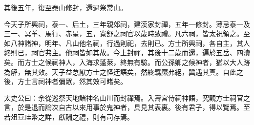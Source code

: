 \begin{pinyinscope}
其後五年，復至泰山修封，還過祭常山。

今天子所興祠，泰一、后土，三年親郊祠，建漢家封禪，五年一修封。薄忌泰一及三一、冥羊、馬行、赤星，五，寬舒之祠官以歲時致禮。凡六祠，皆太祝領之。至如八神諸神，明年、凡山他名祠，行過則祀，去則已。方士所興祠，各自主，其人終則已，祠官弗主。他祠皆如其故。今上封禪，其後十二歲而還，遍於五岳、四瀆矣。而方士之候祠神人，入海求蓬萊，終無有驗。而公孫卿之候神者，猶以大人跡為解，無其效。天子益怠厭方士之怪迂語矣，然終羈縻弗絕，冀遇其真。自此之後，方士言祠神者彌眾，然其效可睹矣。

太史公曰：余從巡祭天地諸神名山川而封禪焉。入壽宮侍祠神語，究觀方士祠官之言，於是退而論次自古以來用事於鬼神者，具見其表裏。後有君子，得以覽焉。至若俎豆珪幣之詳，獻酬之禮，則有司存焉。


\end{pinyinscope}